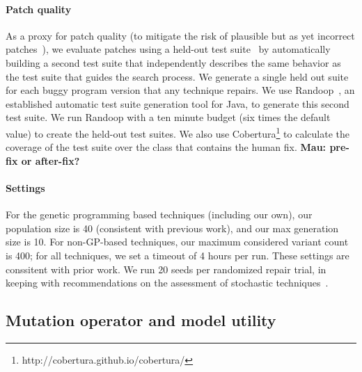 \documentclass[conference]{IEEEtran}
\newcommand{\todo}[1]
  {{\scriptsize \textbf{\color{red} {#1}}}}
\begin{document}
\paragraph{Patch quality}
As a proxy for patch quality (to mitigate the risk of plausible but as yet
incorrect patches~\cite{Qi15}), we evaluate patches using a held-out test
suite~\cite{legoues12Genprog,smith15} by automatically building a second test
suite that independently describes the same behavior as the test suite that
guides the search process. We generate a single held out suite for each buggy program version that any technique
repairs.  We use Randoop~\cite{pacheco07}, an established automatic
test suite generation tool for Java, to generate this second test suite. We run
Randoop with a ten minute budget (six times the default value) to create the
held-out test suites. We also use
Cobertura\footnote{http://cobertura.github.io/cobertura/} to calculate the
coverage of the test suite over the class that contains the human fix.\todo{Mau:
  pre-fix or after-fix?}

\paragraph{Settings} For the genetic programming based techniques (including our own), our population
size is 40 (consistent with previous work), and our max generation size is 10.
For non-GP-based techniques, our maximum considered variant count is 400; for
all techniques, we set a timeout of 4 hours per run.  These settings are
conssitent with prior work.  We run 20 seeds per randomized repair trial, in
keeping with recommendations on the assessment of stochastic
techniques~\cite{arcuri11}.

\subsection{Mutation operator and model utility} \label{sec:oputil}


\newcommand\mII[1]{\multicolumn{2}{c|}{#1}}
\end{document}

